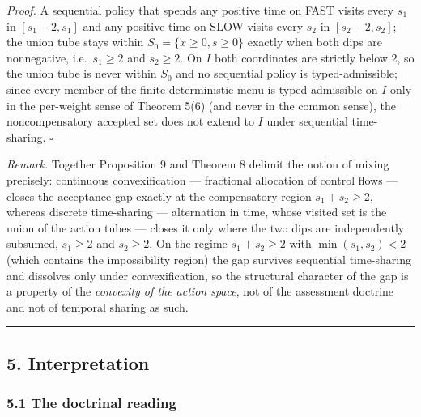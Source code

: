 \documentclass[11pt]{article}
\begin{document}
\emph{Proof.} A sequential policy that spends any positive time on FAST
visits every \(s_1\) in \([s_1 - 2, s_1]\) and any positive time on SLOW
visits every \(s_2\) in \([s_2 - 2, s_2]\); the union tube stays within
\(S_0 = \{x \ge 0, s \ge 0\}\) exactly when both dips are nonnegative,
i.e.~\(s_1 \ge 2\) and \(s_2 \ge 2\). On \(I\) both coordinates are
strictly below 2, so the union tube is never within \(S_0\) and no
sequential policy is typed-admissible; since every member of the finite
deterministic menu is typed-admissible on \(I\) only in the per-weight
sense of Theorem 5(6) (and never in the common sense), the
noncompensatory accepted set does not extend to \(I\) under sequential
time-sharing. \ensuremath{\square}

\emph{Remark.} Together Proposition 9 and Theorem 8 delimit the notion
of mixing precisely: continuous convexification --- fractional
allocation of control flows --- closes the acceptance gap exactly at the
compensatory region \(s_1 + s_2 \ge 2\), whereas discrete time-sharing
--- alternation in time, whose visited set is the union of the action
tubes --- closes it only where the two dips are independently subsumed,
\(s_1 \ge 2\) and \(s_2 \ge 2\). On the regime \(s_1 + s_2 \ge 2\) with
\(\min(s_1, s_2) < 2\) (which contains the impossibility region) the gap
survives sequential time-sharing and dissolves only under
convexification, so the structural character of the gap is a property of
the \emph{convexity of the action space}, not of the assessment doctrine
and not of temporal sharing as such.

\begin{center}\rule{0.5\linewidth}{0.5pt}\end{center}

\subsection{5. Interpretation}\label{interpretation}

\subsubsection{5.1 The doctrinal reading}\label{the-doctrinal-reading}
\end{document}
